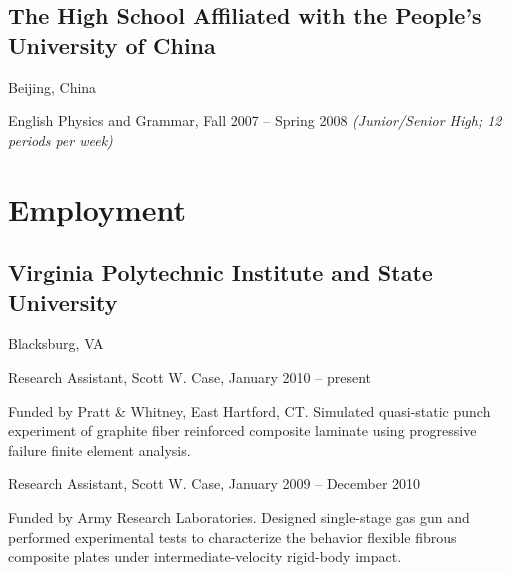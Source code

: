\documentclass[10pt,letterpaper]{article}
\def\vpisu{Virginia Polytechnic Institute and State University}
\renewenvironment{itemize}{
  \begin{list}{}{
    \setlength{\leftmargin}{30pt}
    \setlength{\itemsep}{0.2em}
    \setlength{\parskip}{0pt}
    \setlength{\parsep}{0.25em}
  }
}{
  \end{list}
}
\begin{document}
\subsection*{The High School Affiliated with the People's University of China}
Beijing, China

\begin{itemize}
\item English Physics and Grammar, Fall 2007 -- Spring 2008
  \emph{(Junior/Senior High; 12 periods per week)}
\end{itemize}

\section*{Employment}

\titleformat{\subsection}[runin]{\large \it}{}{0pt}{}[\hfill\ ]

\subsection*{\vpisu}
Blacksburg, VA

\begin{itemize}
\item Research Assistant, Scott W. Case, January 2010 -- present
  \begin{itemize}
  \item Funded by Pratt \& Whitney, East Hartford, CT.  Simulated quasi-static
    punch experiment of graphite fiber reinforced composite laminate using
    progressive failure finite element analysis.
  \end{itemize}
\item Research Assistant, Scott W. Case, January 2009 -- December 2010
  \begin{itemize}
  \item Funded by Army Research Laboratories.  Designed single-stage gas gun and
    performed experimental tests to characterize the behavior flexible fibrous
    composite plates under intermediate-velocity rigid-body impact.
  \end{itemize}
\end{itemize}
\end{document}
